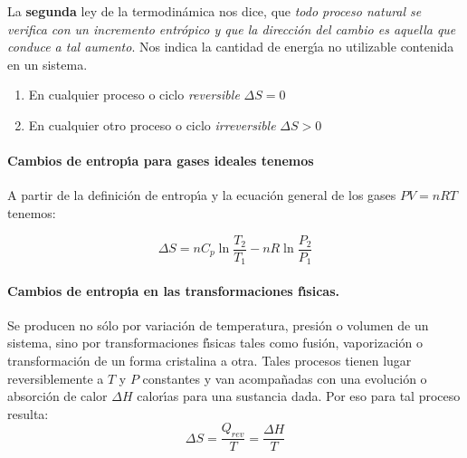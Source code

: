 La \textbf{segunda} ley de la termodin\'amica nos dice,
que \textit{todo proceso natural se verifica con un incremento entr\'opico y que la
direcci\'on del cambio es aquella que conduce a tal aumento}. Nos indica la cantidad de energ\'{\i}a no utilizable contenida en un sistema.

\begin{enumerate}
\item En cualquier proceso o ciclo \textit{reversible} $\Delta S = 0$
\item En cualquier otro proceso o ciclo \textit{irreversible} $\Delta S > 0$
\end{enumerate}

\paragraph{Cambios de entrop\'{\i}a para gases ideales tenemos}  A partir de la definici\'on de entrop\'{\i}a y la ecuaci\'on general de
los gases $PV = nRT$ tenemos:

\begin{equation}
\Delta S = n C_p \ln \frac{T_2}{T_1} -nR\ln \frac{P_2}{P_1}
\end{equation}

\paragraph{Cambios de entrop\'{\i}a en las transformaciones f\'{\i}sicas.}
 Se producen no s\'olo por variaci\'on de temperatura, presi\'on o volumen de un sistema,
sino por transformaciones f\'{\i}sicas tales como fusi\'on, vaporizaci\'on o transformaci\'on
de un forma cristalina a otra. Tales procesos tienen lugar reversiblemente a $T$ y $P$
constantes y van acompa\~nadas con una evoluci\'on o absorci\'on de calor $\Delta H$
calor\'{\i}as para una sustancia dada. Por eso  para tal proceso resulta:
\begin{equation}
\Delta S =  \frac{Q_{rev}}{T} = \frac{\Delta H}{T}
\end{equation}

